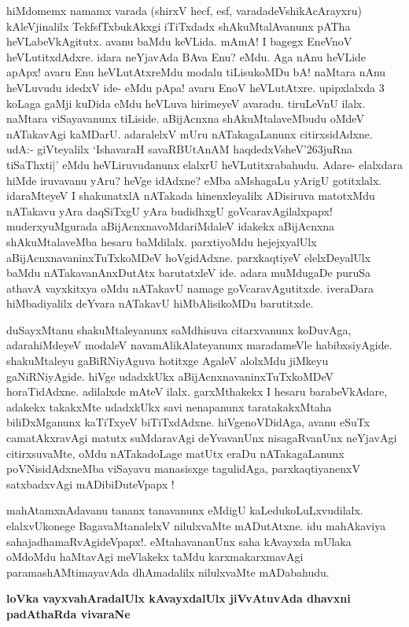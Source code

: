 \noindent
hiMdomemx namamx varada (shirxV hecf, esf, varadadeVshikAcArayxru) kAleVjinalilx TekfsfTxbukAkxgi iTiTxdadx shAkuMtalAvanunx pATha heVLabeVkAgitutx. avanu baMdu keVLida. mAmA! I bagegx EneVnoV heVLu\-titxdAdxre. idara neYjavAda BAva Enu? eMdu. Aga nAnu heVLide apApx! avaru Enu heVLutAtxreMdu modalu tiLisukoMDu bA! naMtara nAnu heVLuvudu idedxV ide- eMdu pApa! avaru EnoV heVLutAtxre. upipxlalxda 3 koLaga gaMji kuDida eMdu heVLuva hirimeyeV avaradu. tiruLeVnU ilalx. naMtara viSayavanunx tiLiside. aBijAcnxna shAkuMtalaveMbudu oMdeV nATakavAgi kaMDarU. adaralelxV mUru nATakagaLanunx citirxsidAdxne. udA:- giVteyalilx `IshavaraH savaRBUtAnAM haqdedxVsheV\char'263juRna tiSaThxti|'\label{235} eMdu heVLiruvudanunx elalxrU heVLutitxrabahudu. Adare- elalxdara hiMde iruvavanu yAru? heVge idAdxne? eMba aMshagaLu yArigU gotitxlalx. idaraMteyeV I shakunatxlA nATakada hinenxleyalilx ADisiruva matotxMdu nATakavu yAra daqSiTxgU yAra budidhxgU goVcaravAgilalxpapx! muderxyuMgurada aBijAcnxnavoMdariMdaleV idakekx aBijAcnxna shAkuMtalaveMba hesaru baMdilalx. parxtiyoMdu hejejxyalUlx aBijAcnxnavaninxTuTxkoMDeV hoVgidAdxne. parxkaqtiyeV elelxDeyalUlx baMdu nATakavanAnxDutAtx barutatxleV ide. adara muMdugaDe puruSa athavA vayxkitxya oMdu nATakavU namage goVcaravAgutitxde. iveraDara hiMbadiyalilx deYvara nATakavU hiMbAlisikoMDu barutitxde.

duSayxMtanu shakuMtaleyanunx saMdhisuva citarxvanunx koDuvAga, adara\break hiMdeyeV modaleV navamA\-likAlateyanunx maradameVle habibxsiyAgide. shakuM\-taleyu gaBiRNiyAguva hotitxge AgaleV alolxMdu jiMkeyu gaNiRNiyAgide. hiVge udadxkUkx aBijAcnxnavaninxTuTxkoMDeV horaTidAdxne. adilalxde mAteV\- ilalx. garxMthakekx I hesaru barabeVkAdare, adakekx takakxMte udadxkUkx savi nenapanunx taratakakxMtaha biliDxM\-ganunx kaTiTxyeV biTiTxdAdxne. hiVgenoVDidAga, avanu eSuTx camatAkxravAgi matutx suMdaravAgi deYvavanUnx nisagaR\-vanUnx neYjavAgi citirxsuvaMte, oMdu nATakadoLage matUtx eraDu nATakagaLanunx poVNisidAdx\-neMba viSayavu manasisxge tagulidAga, parxkaqtiyanenxV satxbadxvAgi mADibiDuteVpapx !

mahAtamxnAdavanu tananx tanavanunx eMdigU kaLedukoLuLxvudilalx. elalxvU\break konege BagavaMtanalelxV nilulxvaMte mADutAtxne. idu mahAkaviya sahajadhamaR\-vAgideVpapx!. eMtahavananUnx saha kAvayxda mUlaka oMdoMdu haMtavAgi meVlakekx taMdu karxmakarxmavAgi paramashAMtimayavAda dhAmadalilx nilulxvaMte mADabahudu.

{\bigskip
\noindent
{\large\bf loVka vayxvahAradalUlx kAvayxdalUlx jiVvAtuvAda dhavxni padAthaRda vivaraNe}}\label{page235}
\medskip

